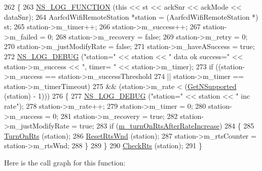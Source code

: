 \begin{DoxyCode}
262 \{
263   \hyperlink{log-macros-disabled_8h_a90b90d5bad1f39cb1b64923ea94c0761}{NS\_LOG\_FUNCTION} (\textcolor{keyword}{this} << st << ackSnr << ackMode << dataSnr);
264   AarfcdWifiRemoteStation *station = (AarfcdWifiRemoteStation *) st;
265   station->m\_timer++;
266   station->m\_success++;
267   station->m\_failed = 0;
268   station->m\_recovery = \textcolor{keyword}{false};
269   station->m\_retry = 0;
270   station->m\_justModifyRate = \textcolor{keyword}{false};
271   station->m\_haveASuccess = \textcolor{keyword}{true};
272   \hyperlink{group__logging_ga413f1886406d49f59a6a0a89b77b4d0a}{NS\_LOG\_DEBUG} (\textcolor{stringliteral}{"station="} << station << \textcolor{stringliteral}{" data ok success="} << station->m\_success << \textcolor{stringliteral}{", timer=
      "} << station->m\_timer);
273   \textcolor{keywordflow}{if} ((station->m\_success == station->m\_successThreshold
274        || station->m\_timer == station->m\_timerTimeout)
275       && (station->m\_rate < (\hyperlink{classns3_1_1WifiRemoteStationManager_a7316bf091ebad5b8cd1a8b5ee47554d8}{GetNSupported} (station) - 1)))
276     \{
277       \hyperlink{group__logging_ga413f1886406d49f59a6a0a89b77b4d0a}{NS\_LOG\_DEBUG} (\textcolor{stringliteral}{"station="} << station << \textcolor{stringliteral}{" inc rate"});
278       station->m\_rate++;
279       station->m\_timer = 0;
280       station->m\_success = 0;
281       station->m\_recovery = \textcolor{keyword}{true};
282       station->m\_justModifyRate = \textcolor{keyword}{true};
283       \textcolor{keywordflow}{if} (\hyperlink{classns3_1_1AarfcdWifiManager_a0938e5a61b20c3a78db3667d1e06f2fe}{m\_turnOnRtsAfterRateIncrease})
284         \{
285           \hyperlink{classns3_1_1AarfcdWifiManager_a7c0735a4d35702f34551d000808d9875}{TurnOnRts} (station);
286           \hyperlink{classns3_1_1AarfcdWifiManager_a058177eefb3e0938db7a6dae911d4f1b}{ResetRtsWnd} (station);
287           station->m\_rtsCounter = station->m\_rtsWnd;
288         \}
289     \}
290   \hyperlink{classns3_1_1AarfcdWifiManager_ae5874a6eb640c1873aa0f1b3da958be0}{CheckRts} (station);
291 \}
\end{DoxyCode}


Here is the call graph for this function\+:


